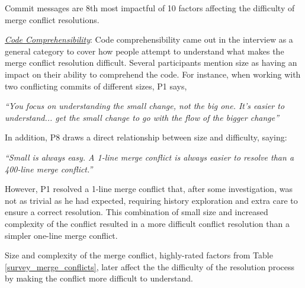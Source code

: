 \begin{tcolorbox}[enhanced,minipage boxed title,enhanced,title={Takeaway \arabic{takeawaycounter}},
attach boxed title to top left=
{xshift=0mm,yshift=-1mm},
boxed title style={size=small}]
Commit messages are 8th most impactful of 10 factors affecting the difficulty of merge conflict resolutions.
\end{tcolorbox}
\addtocounter{takeawaycounter}{1}


\underline{\textit{Code Comprehensibility}}:
Code comprehensibility came out in the interview as a general category to cover how people attempt to understand what makes the merge conflict resolution difficult. Several participants mention size as having an impact on their ability to comprehend the code. For instance, when working with two conflicting commits of different sizes, P1 says,
\begin{displayquote}
\textit{``You focus on understanding the small change, not the big one. It's easier to understand... get the small change to go with the flow of the bigger change''}
\end{displayquote}	

In addition, P8 draws a direct relationship between size and difficulty, saying:
\begin{displayquote}
\textit{``Small is always easy. A 1-line merge conflict is always easier to resolve than a 400-line merge conflict.''}
\end{displayquote}

However, P1 resolved a 1-line merge conflict that, after some investigation, was not as trivial as he had expected, requiring history exploration and extra care to ensure a correct resolution. This combination of small size and increased complexity of the conflict resulted in a more difficult conflict resolution than a simpler one-line merge conflict.

\begin{tcolorbox}[enhanced,minipage boxed title,enhanced,title={Takeaway \arabic{takeawaycounter}},
attach boxed title to top left=
{xshift=0mm,yshift=-1mm},
boxed title style={size=small}]
Size and complexity of the merge conflict, highly-rated factors from Table \ref{survey_merge_conflicts}, later affect the the difficulty of the resolution process by making the conflict more difficult to understand.
\end{tcolorbox}
\addtocounter{takeawaycounter}{1}

